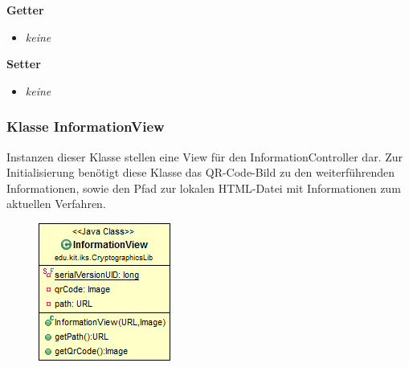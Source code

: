 \documentclass{article}
\begin{document}
      \textbf{Getter}
      \begin{itemize}
		\item \textit{keine}
      \end{itemize}
      
      \textbf{Setter}
      \begin{itemize}
        \item \textit{keine}
      \end{itemize}
	
	\subsubsection{Klasse InformationView}
	  Instanzen dieser Klasse stellen eine View für den InformationController dar.
	  Zur Initialisierung benötigt diese Klasse das QR-Code-Bild zu den weiterführenden 
	  Informationen, sowie den Pfad zur lokalen HTML-Datei mit Informationen zum
	  aktuellen Verfahren.
	
      \begin{figure}[H]
        \centering
        \includegraphics[width=\textwidth]{resources/edu-kit-iks-CryptographicsLib-InformationView}
      \end{figure}
	
\end{document}
